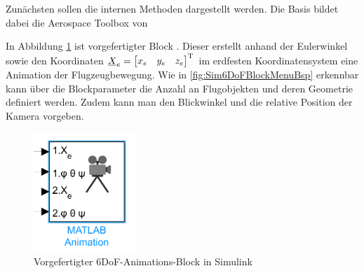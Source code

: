 Zunächsten sollen die \MatSim internen Methoden dargestellt werden.
Die Basis bildet dabei die Aerospace Toolbox von \MatSim

In Abbildung \ref{fig:Sim6DoFBlock} ist vorgefertigter Block \cite{Sim6DoFDoku}. Dieser erstellt anhand der Eulerwinkel sowie den Koordinaten $\underline{X}_{e} = \begin{bmatrix}x_e &y_e &z_e \end{bmatrix}^{\textnormal{T}}$ im erdfesten Koordinatensystem eine Animation der Flugzeugbewegung.
Wie in \ref{fig:Sim6DoFBlockMenuBsp} erkennbar kann über die Blockparameter die Anzahl an Flugobjekten und deren Geometrie definiert werden. Zudem kann man den Blickwinkel und die relative Position der Kamera vorgeben. 
\begin{figure}[H]
	\centering
	\includegraphics[width=0.35\textwidth]{./Bilder/Visual_SimBlock.png}
	\caption{Vorgefertigter 6DoF-Animations-Block in Simulink}
	\label{fig:Sim6DoFBlock}
\end{figure}

